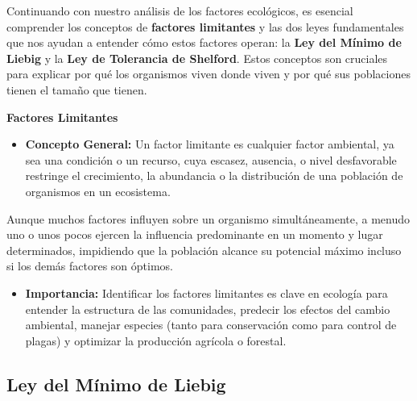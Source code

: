 \documentclass[
]{book}
\providecommand{\tightlist}{%
  \setlength{\itemsep}{0pt}\setlength{\parskip}{0pt}}
\begin{document}
Continuando con nuestro análisis de los factores ecológicos, es esencial comprender los conceptos de \textbf{factores limitantes} y las dos leyes fundamentales que nos ayudan a entender cómo estos factores operan: la \textbf{Ley del Mínimo de Liebig} y la \textbf{Ley de Tolerancia de Shelford}. Estos conceptos son cruciales para explicar por qué los organismos viven donde viven y por qué sus poblaciones tienen el tamaño que tienen.

\textbf{Factores Limitantes}

\begin{itemize}
\tightlist
\item
  \textbf{Concepto General:} Un factor limitante es cualquier factor ambiental, ya sea una condición o un recurso, cuya escasez, ausencia, o nivel desfavorable restringe el crecimiento, la abundancia o la distribución de una población de organismos en un ecosistema.
\end{itemize}

Aunque muchos factores influyen sobre un organismo simultáneamente, a menudo uno o unos pocos ejercen la influencia predominante en un momento y lugar determinados, impidiendo que la población alcance su potencial máximo incluso si los demás factores son óptimos.

\begin{itemize}
\tightlist
\item
  \textbf{Importancia:} Identificar los factores limitantes es clave en ecología para entender la estructura de las comunidades, predecir los efectos del cambio ambiental, manejar especies (tanto para conservación como para control de plagas) y optimizar la producción agrícola o forestal.
\end{itemize}

\subsection*{\texorpdfstring{\textbf{Ley del Mínimo de Liebig}}{Ley del Mínimo de Liebig}}\label{liebig}
\end{document}
